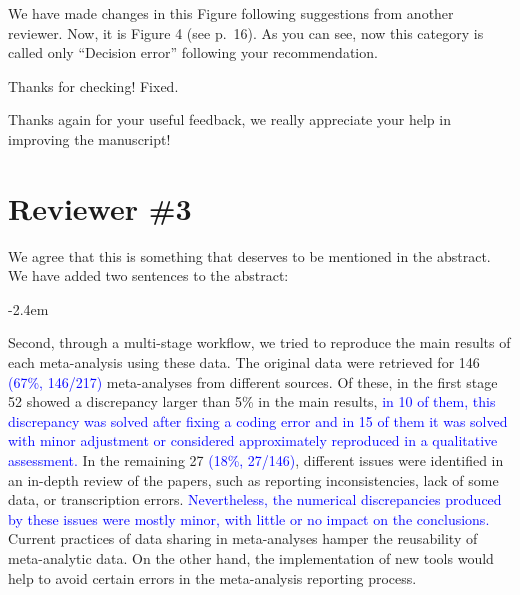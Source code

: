 \documentclass[draft]{article}
\renewenvironment{quote}{\begin{fquote}\advance\leftmargini -2.4em\begin{oldquote}}{\end{oldquote}\end{fquote}}
\newenvironment{fquote}
  {\def\FrameCommand{
	\fboxsep=0.6em %
	\fcolorbox{black}{white}}%
    \MakeFramed {\advance\hsize-2\width \FrameRestore}
    \begin{minipage}{\linewidth}
  }
  {\end{minipage}\endMakeFramed}
\begin{document}
We have made changes in this Figure following suggestions from another reviewer. Now, it is Figure 4 (see p.~16). As you can see, now this category is called only ``Decision error'' following your recommendation.


Thanks for checking! Fixed.


Thanks again for your useful feedback, we really appreciate your help in improving the manuscript!

\hypertarget{reviewer-3}{%
\section{Reviewer \#3}\label{reviewer-3}}


We agree that this is something that deserves to be mentioned in the abstract. We have added two sentences to the abstract:

\begin{quote}
Second, through a multi-stage workflow, we tried to reproduce the main results of each meta-analysis using these data. The original data were retrieved for 146 \textcolor{blue}{(67\%, 146/217)} meta-analyses from different sources. Of these, in the first stage 52 showed a discrepancy larger than 5\% in the main results, \textcolor{blue}{in 10 of them, this discrepancy was solved after fixing a coding error and in 15 of them it was solved with minor adjustment or considered approximately reproduced in a qualitative assessment.} In the remaining 27 \textcolor{blue}{(18\%, 27/146)}, different issues were identified in an in-depth review of the papers, such as reporting inconsistencies, lack of some data, or transcription errors. \textcolor{blue}{Nevertheless, the numerical discrepancies produced by these issues were mostly minor, with little or no impact on the conclusions.} Current practices of data sharing in meta-analyses hamper the reusability of meta-analytic data. On the other hand, the implementation of new tools would help to avoid certain errors in the meta-analysis reporting process.
\end{quote}
\end{document}
